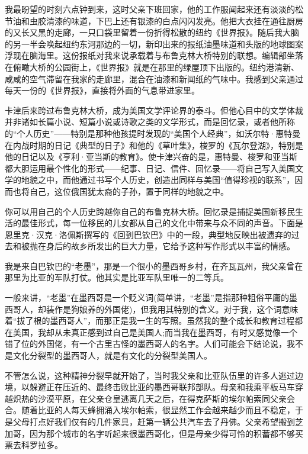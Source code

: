 我最盼望的时刻六点钟到来，这时父亲下班回家，他的工作服闻起来还有淡淡的松节油和虫胶清漆的味道，下巴上还有银漆的白点闪闪发亮。他把大衣挂在通往厨房的又长又黑的走廊，一只口袋里留着一份折得松散的纽约《世界报》。随后我大脑的另一半会唤起纽约东河那边的一切，新印出来的报纸油墨味道和头版的地球图案浮现在脑海里。这份报纸对我来说承载着与布鲁克林大桥特别的联想。编辑部坐落在俯瞰大桥的公园街上，《世界报》就是在那里的绿屋顶下出版的。纽约港清新、咸咸的空气滞留在我家的走廊里，混合在油漆和新闻纸的气味中。我感到父亲通过每天一份的《世界报》，直接将外面的气息带进家里。

卡津后来跨过布鲁克林大桥，成为美国文学评论界的泰斗。但他心目中的文学体裁并非诸如长篇小说、短篇小说或诗歌之类的文学形式，而是回忆录，或者他所称的“个人历史”——特别是那种他孩提时发现的“美国个人经典”，如沃尔特·惠特曼在内战时期的日记《典型的日子》和他的《草叶集》，梭罗的《瓦尔登湖》，特别是他的日记以及《亨利·亚当斯的教育》。使卡津兴奋的是，惠特曼、梭罗和亚当斯都大胆运用最个性化的形式——纪事、日记、信件、回忆录——将自己写入美国文学的地貌之中，而他通过书写个人历史，创造出同样与美国“值得珍视的联系”，因而也将自己，这位俄国犹太裔的子孙，置于同样的地貌之中。

你可以用自己的个人历史跨越你自己的布鲁克林大桥。回忆录是捕捉美国新移民生活的最佳形式，每一位移民的儿女都从自己的文化中带来与众不同的声音。下面是恩里克·汉克·洛佩斯撰写的《回到巴钦巴》中的一段，典型地反映出被遗弃的过去和被抛在身后的故乡所发出的巨大力量，它给予这种写作形式以丰富的情感。

我是来自巴钦巴的“老墨”，那是一个很小的墨西哥乡村，在齐瓦瓦州，我父亲曾在那里为比亚的军队打仗。他其实是比亚军队里唯一的二等兵。

一般来讲，“老墨”在墨西哥是一个贬义词(简单讲，“老墨”是指那种粗俗平庸的墨西哥人，却装作是狗娘养的外国佬)，但我用其特别的含义。对于我，这个词意味着“拔了根的墨西哥人”，而那正是我一生的写照。虽然我的整个成长和教育过程都在美国，我却从未真正感到过自己是美国人;而当我在墨西哥，有时又感觉像一个错了位的外国佬，有一个古里古怪的墨西哥人的名字。人们可能会下结论说，我不是文化分裂型的墨西哥人，就是有文化的分裂型美国人。

不管怎么说，这种精神分裂早就开始了，当时我父亲和比亚队伍里的许多人逃过边境，以躲避正在压近的、最终击败比亚的墨西哥联邦部队。母亲和我乘平板马车穿越炽热的沙漠平原，在父亲仓皇逃离几天之后，在得克萨斯的埃尔帕索同父亲会合。随着比亚的人每天蜂拥涌入埃尔帕索，很显然工作会越来越少而且不稳定，于是父母打点好我们仅有的几件家具，赶第一辆公共汽车去了丹佛。父亲希望搬到芝加哥，因为那个城市的名字听起来很墨西哥化，但是母亲少得可怜的积蓄都不够买票去科罗拉多。

